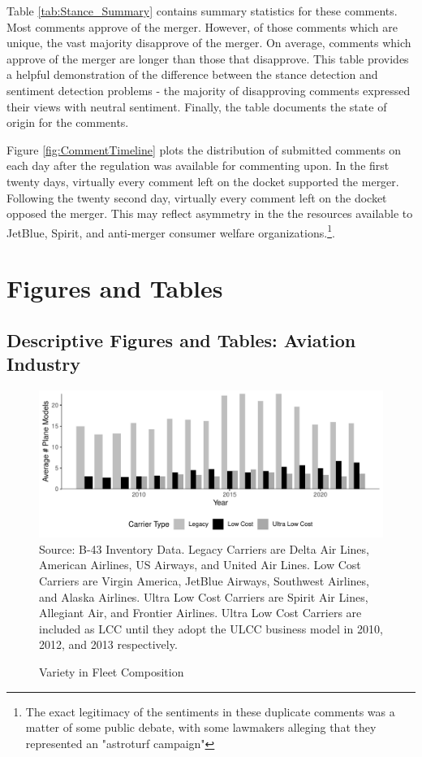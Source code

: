 \documentclass{article}
\let\Oldsubsection\subsection
\renewcommand{\subsection}{\FloatBarrier\Oldsubsection}
\begin{document}
\begin{appendices}
Table \ref{tab:Stance_Summary} contains summary statistics for these comments. Most comments approve of the merger. However, of those comments which are unique, the vast majority disapprove of the merger. On average, comments which approve of the merger are longer than those that disapprove. This table provides a helpful demonstration of the difference between the stance detection and sentiment detection problems -  the majority of disapproving comments expressed their views with neutral sentiment. Finally, the table documents the state of origin for the comments. 


Figure \ref{fig:CommentTimeline} plots the distribution of submitted comments on each day after the regulation was available for commenting upon. In the first twenty days, virtually every comment left on the docket supported the merger. Following the twenty second day, virtually every comment left on the docket opposed the merger. This may reflect asymmetry in the the resources available to JetBlue, Spirit, and anti-merger consumer welfare organizations.\footnote{The exact legitimacy of the sentiments in these duplicate comments was a matter of some public debate, with some lawmakers alleging that they represented an "astroturf campaign"\citep{birnbaum_elizabeth_2023}}.  

	\FloatBarrier
	\pagebreak
	\section{Figures and Tables}	
	
	\subsection{Descriptive Figures and Tables: Aviation Industry}
	
	\begin{figure}[h]
		\caption{Variety in Fleet Composition}
		\label{fig:Fleet_Composition}
		\includegraphics[width = \linewidth]{average_plane_types_in_use.pdf}
		\footnotesize{Source: B-43 Inventory Data. Legacy Carriers are Delta Air Lines, American Airlines, US Airways, and United Air Lines. Low Cost Carriers are Virgin America, JetBlue Airways, Southwest Airlines, and Alaska Airlines. Ultra Low Cost Carriers are Spirit Air Lines, Allegiant Air, and Frontier Airlines. Ultra Low Cost Carriers are included as LCC until they adopt the ULCC business model in  2010,  2012, and  2013 respectively.}
	\end{figure}
	

\end{appendices}
\end{document}

